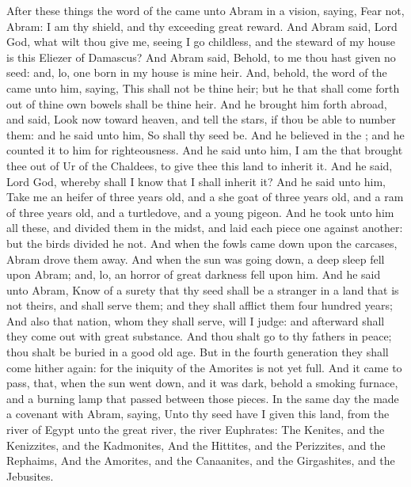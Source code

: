 \begin{biblechapter} %
 After these things the word of the \LORD came unto Abram in a vision, saying, Fear not, Abram: I am thy shield, and thy exceeding great reward.
\verse And Abram said, Lord God, what wilt thou give me, seeing I go childless, and the steward of my house is this Eliezer of Damascus?
\verse And Abram said, Behold, to me thou hast given no seed: and, lo, one born in my house is mine heir.
\verse And, behold, the word of the \LORD came unto him, saying, This shall not be thine heir; but he that shall come forth out of thine own bowels shall be thine heir.
\verse And he brought him forth abroad, and said, Look now toward heaven, and tell the stars, if thou be able to number them: and he said unto him, So shall thy seed be.
\verse And he believed in the \LORD; and he counted it to him for righteousness.
\verse And he said unto him, I am the \LORD that brought thee out of Ur of the Chaldees, to give thee this land to inherit it.
\verse And he said, Lord God, whereby shall I know that I shall inherit it?
\verse And he said unto him, Take me an heifer of three years old, and a she goat of three years old, and a ram of three years old, and a turtledove, and a young pigeon.
\verse And he took unto him all these, and divided them in the midst, and laid each piece one against another: but the birds divided he not.
\verse And when the fowls came down upon the carcases, Abram drove them away.
\verse And when the sun was going down, a deep sleep fell upon Abram; and, lo, an horror of great darkness fell upon him.
\verse And he said unto Abram, Know of a surety that thy seed shall be a stranger in a land that is not theirs, and shall serve them; and they shall afflict them four hundred years;
\verse And also that nation, whom they shall serve, will I judge: and afterward shall they come out with great substance.
\verse And thou shalt go to thy fathers in peace; thou shalt be buried in a good old age.
\verse But in the fourth generation they shall come hither again: for the iniquity of the Amorites is not yet full.
\verse And it came to pass, that, when the sun went down, and it was dark, behold a smoking furnace, and a burning lamp that passed between those pieces.
\verse In the same day the \LORD made a covenant with Abram, saying, Unto thy seed have I given this land, from the river of Egypt unto the great river, the river Euphrates:
\verse The Kenites, and the Kenizzites, and the Kadmonites,
\verse And the Hittites, and the Perizzites, and the Rephaims,
\verse And the Amorites, and the Canaanites, and the Girgashites, and the Jebusites.
\end{biblechapter}

